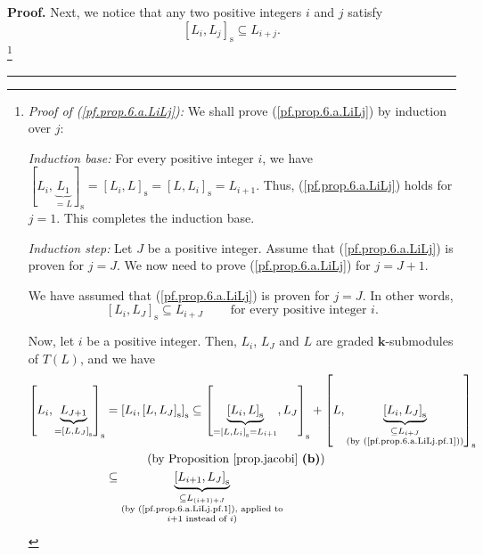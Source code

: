 \documentclass[numbers=enddot,12pt,final,onecolumn,notitlepage]{scrartcl}%
\theoremstyle{definition}
\newenvironment{proof}[1][Proof]{\noindent\textbf{#1.} }{\ \rule{0.5em}{0.5em}}
\begin{document}
\begin{proof}
Next, we notice that any two positive integers $i$ and $j$ satisfy%
\begin{equation}
\left[  L_{i},L_{j}\right]  _{\operatorname*{s}}\subseteq L_{i+j}.
\label{pf.prop.6.a.LiLj}%
\end{equation}
\footnote{\textit{Proof of (\ref{pf.prop.6.a.LiLj}):} We shall prove
(\ref{pf.prop.6.a.LiLj}) by induction over $j$:
\par
\textit{Induction base:} For every positive integer $i$, we have $\left[
L_{i},\underbrace{L_{1}}_{=L}\right]  _{\operatorname*{s}}=\left[
L_{i},L\right]  _{\operatorname*{s}}=\left[  L,L_{i}\right]
_{\operatorname*{s}}=L_{i+1}$. Thus, (\ref{pf.prop.6.a.LiLj}) holds for $j=1$.
This completes the induction base.
\par
\textit{Induction step:} Let $J$ be a positive integer. Assume that
(\ref{pf.prop.6.a.LiLj}) is proven for $j=J$. We now need to prove
(\ref{pf.prop.6.a.LiLj}) for $j=J+1$.
\par
We have assumed that (\ref{pf.prop.6.a.LiLj}) is proven for $j=J$. In other
words,%
\begin{equation}
\left[  L_{i},L_{J}\right]  _{\operatorname*{s}}\subseteq L_{i+J}%
\ \ \ \ \ \ \ \ \ \ \text{for every positive integer }i.
\label{pf.prop.6.a.LiLj.pf.1}%
\end{equation}
\par
Now, let $i$ be a positive integer. Then, $L_{i}$, $L_{J}$ and $L$ are graded
$\mathbf{k}$-submodules of $T\left(  L\right)  $, and we have%
\begin{align*}
\left[  L_{i},\underbrace{L_{J+1}}_{=\left[  L,L_{J}\right]
_{\operatorname*{s}}}\right]  _{\operatorname*{s}}  &  =\left[  L_{i},\left[
L,L_{J}\right]  _{\operatorname*{s}}\right]  _{\operatorname*{s}}%
\subseteq\left[  \underbrace{\left[  L_{i},L\right]  _{\operatorname*{s}}%
}_{=\left[  L,L_{i}\right]  _{\operatorname*{s}}=L_{i+1}},L_{J}\right]
_{\operatorname*{s}}+\left[  L,\underbrace{\left[  L_{i},L_{J}\right]
_{\operatorname*{s}}}_{\substack{\subseteq L_{i+J}\\\text{(by
(\ref{pf.prop.6.a.LiLj.pf.1}))}}}\right]  _{\operatorname*{s}}\\
&  \ \ \ \ \ \ \ \ \ \ \left(  \text{by Proposition \ref{prop.jacobi}
\textbf{(b)}}\right) \\
&  \subseteq\underbrace{\left[  L_{i+1},L_{J}\right]  _{\operatorname*{s}}%
}_{\substack{\subseteq L_{\left(  i+1\right)  +J}\\\text{(by
(\ref{pf.prop.6.a.LiLj.pf.1}), applied to}\\i+1\text{ instead of }i\text{)}%
}}
\end{align*}}
\end{proof}
\end{document}
